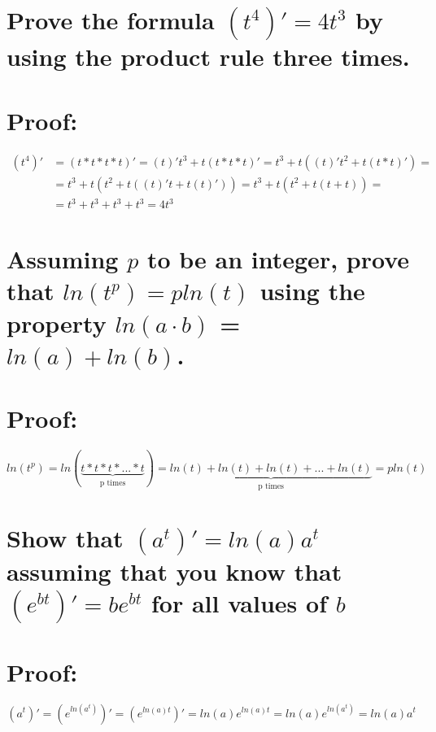 \documentclass{article}
\begin{document}
\section{\normalfont Prove the formula $(t^4)' = 4t^3$ by using the product rule three times.}

\section*{Proof:}

\begin{equation}
\begin{split}
(t^4)' & = (t*t*t*t)' = (t)'t^3 + t(t*t*t)' = t^3 + t((t)'t^2 + t(t*t)') = \\
& = t^3 + t(t^2 + t((t)'t + t(t)')) = t^3 + t(t^2 + t(t + t)) = \\ 
& = t^3 + t^3 + t^3 + t^3 = 4t^3
\end{split}
\end{equation}

\section{\normalfont Assuming $p$ to be an integer, prove that $ln(t^p) = p ln(t)$ using the property $ln(a · b)$ = $ln(a) + ln(b)$.}

\section*{Proof:}

\begin{equation}
ln(t^p) = ln(\underbrace{t*t*t*...*t}_{\text{p times}}) = \underbrace{ln(t) + ln(t) + ln(t) + ... + ln(t)}_{\text{p times}} = pln(t)
\end{equation}

\section{\normalfont Show that $(a^t)' = ln(a)a^t$ assuming that you know that $(e^{bt})' = be^{bt}$ for all values of $b$}

\section*{Proof:}

\begin{equation}
(a^t)' = (e^{ln(a^t)})' = (e^{ln(a)t})' = ln(a)e^{ln(a)t} = ln(a)e^{ln(a^t)} = ln(a)a^t
\end{equation}
\end{document}
